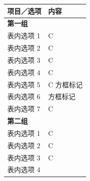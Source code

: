 \documentclass[UTF8,10pt,a4paper,fontset=fandol]{ctexart}
\newcommand{\fieldvalue}[1]{#1}
\newcommand{\handwritten}[1]{#1}
\begin{document}
\begin{tabularx}{\textwidth}{|p{}|X|}
\hline
\textbf{项目／选项} & \textbf{内容} \\
\hline
\multicolumn{2}{|l|}{\textbf{第一组}} \\
\hline
表内选项 1 &
\fieldvalue{\handwritten{C}} \\
\hline
表内选项 2 &
\fieldvalue{\handwritten{C}} \\
\hline
表内选项 3 &
\fieldvalue{\handwritten{C}} \\
\hline
表内选项 4 &
\fieldvalue{\handwritten{C}} \\
\hline
表内选项 5 &
\fieldvalue{\handwritten{C}} \qquad
\fieldvalue{\handwritten{方框标记}} \\
\hline
表内选项 6 &
\fieldvalue{\handwritten{方框标记}} \\
\hline
表内选项 7 &
\fieldvalue{\handwritten{C}} \\
\hline
\multicolumn{2}{|l|}{\textbf{第二组}} \\
\hline
表内选项 1 &
\fieldvalue{\handwritten{C}} \\
\hline
表内选项 2 &
\fieldvalue{\handwritten{C}} \\
\hline
表内选项 3 &
\fieldvalue{\handwritten{C}} \\
\hline
表内选项 4 &

\end{tabularx}
\end{document}
